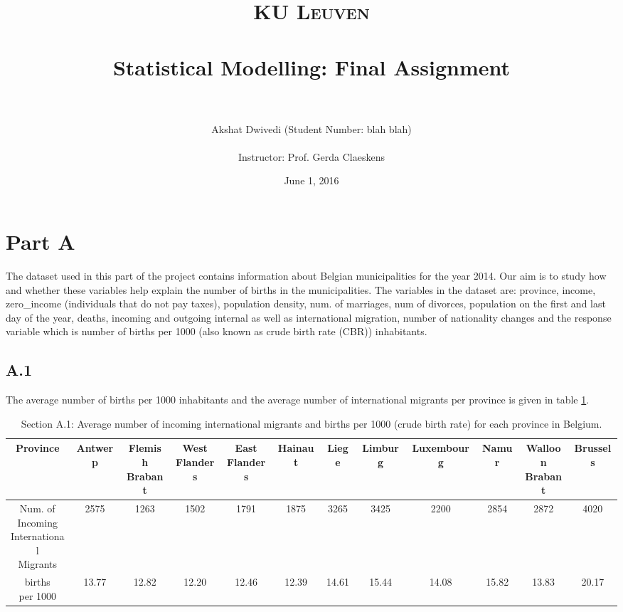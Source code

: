 \documentclass[paper=a4, fontsize=11pt]{scrartcl} %
\title{	
\normalfont \normalsize 
\textsc{\Large KU Leuven} \\ [30pt] %
\horrule{0.5pt} \\[0.4cm] %
\huge Statistical Modelling: Final Assignment \\ %
\horrule{2pt} \\[0.5cm] %
}
\author{Akshat Dwivedi (Student Number: blah blah)\\
\\
Instructor: Prof. Gerda Claeskens} %
\date{June 1, 2016} %
\numberwithin{equation}{section} %
\begin{document}
\maketitle %


\thispagestyle{empty}
\clearpage
\setcounter{page}{1}



\section{Part A}

The dataset used in this part of the project contains information about Belgian municipalities for the year 2014. Our aim is to study how and whether these variables help explain the number of births in the municipalities. The variables in the dataset are: province, income, zero\_income (individuals that do not pay taxes), population density, num. of marriages, num of divorces, population on the first and last day of the year, deaths, incoming and outgoing  internal as well as international migration, number of nationality changes and the response variable which is number of births per 1000 (also known as crude birth rate (CBR)) inhabitants.

\subsection{A.1}

The average number of births per 1000 inhabitants and the average number of international migrants per province is given in table \ref{average}.

\begin{table}[h]
\centering
\begin{adjustbox}{max width=\textwidth}
\begin{tabular}{c|ccccccccccc}
\hline
Province & Antwerp & \thead{Flemish \\ Brabant} & \thead{West \\ Flanders} & \thead{East \\ Flanders} & Hainaut & Liege & Limburg & Luxembourg & Namur & \thead{Walloon \\ Brabant} & Brussels \\
\hline
\thead{Num. of \\ Incoming \\ International \\ Migrants} & 2575 & 1263 & 1502 & 1791 & 1875 & 3265 & 3425 & 2200 & 2854 & 2872 & 4020 \\
\hline
\thead{births \\ per 1000} & 13.77 & 12.82 & 12.20 & 12.46 & 12.39 & 14.61 & 15.44 & 14.08 & 15.82 & 13.83 & 20.17 \\
\hline
\end{tabular}
\end{adjustbox}
\caption{Section A.1: Average number of incoming international migrants and births per 1000 (crude birth rate) for each province in Belgium.}
\label{average}
\end{table}
\end{document}
